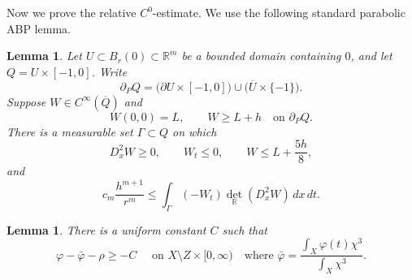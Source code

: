 \documentclass[reqno]{amsart}
\theoremstyle{remark}
\theoremstyle{plain}
\newtheorem{lemma}[thm]{Lemma}
\begin{document}
Now we prove the relative $C^0$-estimate. 
We use the following standard parabolic ABP lemma.

\begin{lemma}\label{lem:ABP}
Let $U\subset B_r(0)\subset\mathbb R^m$ be a bounded
domain containing $0$, and let $Q=U\times[-1,0]$.
Write
\[
 \partial_PQ
 =\bigl(\partial U\times[-1,0]\bigr)
  \cup\bigl(\overline{U}\times\{-1\}\bigr).
\]
 Suppose
 $W\in C^\infty(\overline Q)$ and
\[
 W(0,0)=L,\qquad W\geq L+h\quad\text{on }\partial_PQ.
\]
There is a measurable set $\Gamma\subset Q$ on which
\[
 D_x^2W\geq0,\qquad W_t\leq0,\qquad
 W\leq L+\frac{5h}{8},
\]
and
\begin{equation}\label{eq:ABP-general}
 c_m\frac{h^{m+1}}{r^m}
 \leq
 \int_\Gamma(-W_t)\det_{\mathbb R}(D_x^2W)\,dx\,dt.
\end{equation}
\end{lemma}



\begin{lemma}\label{lem:C0-estimate}
    There is a uniform constant $C$ such that \[
    \varphi-\bar{\varphi}-\rho\geq -C \quad \text{ on } X\setminus Z\times [0,\infty) \quad \text{where }\bar\varphi=\frac{\int_{X}\varphi(t)\chi^3}{\int_X\chi^3}.
    \]
\end{lemma}
\end{document}

